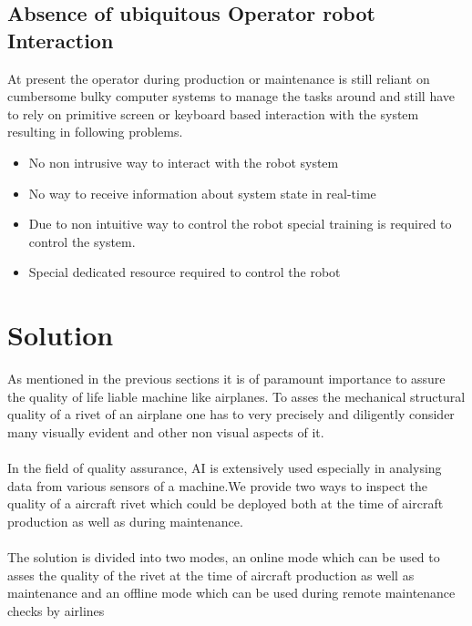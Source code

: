 \documentclass{article}
\begin{document}
\quad \quad \subsection{Absence of ubiquitous Operator robot Interaction}

At present the operator during production or maintenance is still reliant on cumbersome bulky computer systems to manage the tasks around and still have to rely on primitive screen or keyboard based interaction with the system resulting in following problems.

 \begin{itemize}

        \item No non intrusive way to interact with the robot system
        \item No way to receive information about system state in real-time
        \item Due to non intuitive way to control the robot special training is required to control the system.
        \item Special dedicated resource required to control the robot
        
    \end{itemize}



\section{Solution}

As mentioned in the previous sections it is of paramount importance to assure the quality of life liable machine like airplanes. To asses the mechanical structural quality of a rivet of an airplane one has to very precisely and diligently consider many visually evident and other non visual aspects of it.\\\\
In  the  field  of  quality  assurance,  AI  is  extensively  used especially in analysing data from various sensors of a machine.We provide two ways to inspect the quality of a aircraft rivet which could be deployed both at the time of aircraft production as well as during maintenance.\\\\
The solution is divided into two  modes,  an  online  mode  which  can be  used  to  asses  the quality  of  the  rivet  at  the  time  of  aircraft  production  as  well as maintenance and an offline mode which can be used during remote maintenance checks by airlines
    
\end{document}
